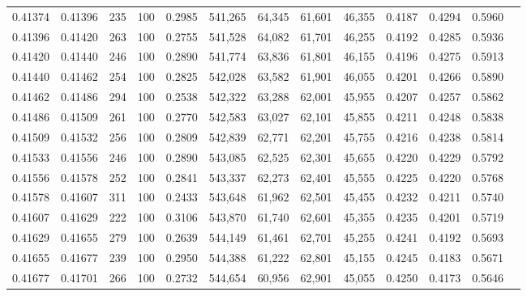 \begin{tabular}{rrrrrrrrrrrrr}
0.41374 & 0.41396 &    235 & 100 &                                     0.2985 & 541,265 &  64,345 &  61,601 &  46,355 & 0.4187 & 0.4294 & 0.5960 \\
0.41396 & 0.41420 &    263 & 100 &                                     0.2755 & 541,528 &  64,082 &  61,701 &  46,255 & 0.4192 & 0.4285 & 0.5936 \\
0.41420 & 0.41440 &    246 & 100 &                                     0.2890 & 541,774 &  63,836 &  61,801 &  46,155 & 0.4196 & 0.4275 & 0.5913 \\
0.41440 & 0.41462 &    254 & 100 &                                     0.2825 & 542,028 &  63,582 &  61,901 &  46,055 & 0.4201 & 0.4266 & 0.5890 \\
0.41462 & 0.41486 &    294 & 100 &                                     0.2538 & 542,322 &  63,288 &  62,001 &  45,955 & 0.4207 & 0.4257 & 0.5862 \\
0.41486 & 0.41509 &    261 & 100 &                                     0.2770 & 542,583 &  63,027 &  62,101 &  45,855 & 0.4211 & 0.4248 & 0.5838 \\
0.41509 & 0.41532 &    256 & 100 &                                     0.2809 & 542,839 &  62,771 &  62,201 &  45,755 & 0.4216 & 0.4238 & 0.5814 \\
0.41533 & 0.41556 &    246 & 100 &                                     0.2890 & 543,085 &  62,525 &  62,301 &  45,655 & 0.4220 & 0.4229 & 0.5792 \\
0.41556 & 0.41578 &    252 & 100 &                                     0.2841 & 543,337 &  62,273 &  62,401 &  45,555 & 0.4225 & 0.4220 & 0.5768 \\
0.41578 & 0.41607 &    311 & 100 &                                     0.2433 & 543,648 &  61,962 &  62,501 &  45,455 & 0.4232 & 0.4211 & 0.5740 \\
0.41607 & 0.41629 &    222 & 100 &                                     0.3106 & 543,870 &  61,740 &  62,601 &  45,355 & 0.4235 & 0.4201 & 0.5719 \\
0.41629 & 0.41655 &    279 & 100 &                                     0.2639 & 544,149 &  61,461 &  62,701 &  45,255 & 0.4241 & 0.4192 & 0.5693 \\
0.41655 & 0.41677 &    239 & 100 &                                     0.2950 & 544,388 &  61,222 &  62,801 &  45,155 & 0.4245 & 0.4183 & 0.5671 \\
0.41677 & 0.41701 &    266 & 100 &                                     0.2732 & 544,654 &  60,956 &  62,901 &  45,055 & 0.4250 & 0.4173 & 0.5646 \\

\end{tabular}
